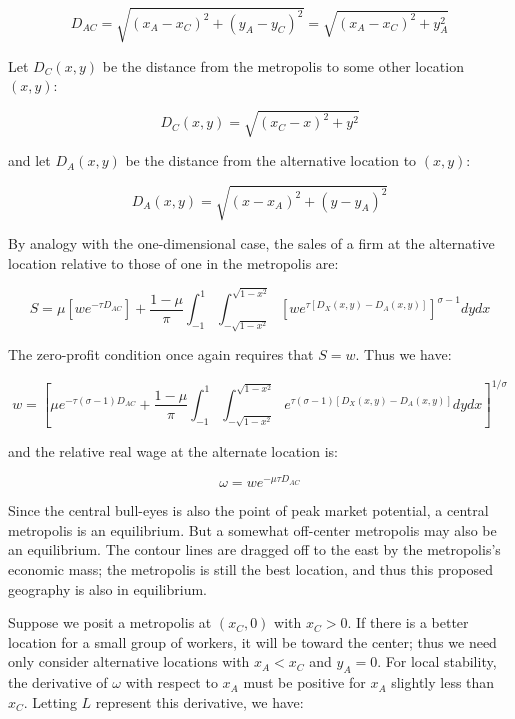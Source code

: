 \begin{equation}
    D_{AC} = \sqrt{(x_A - x_C)^2 + (y_A - y_C)^2} = \sqrt{(x_A - x_C)^2 + y_A^2}
\end{equation}

Let $D_C(x, y)$ be the distance from the metropolis to some other location $(x, y)$:

\begin{equation}
    D_C(x, y) = \sqrt{(x_C - x)^2 + y^2}
\end{equation}

and let $D_A(x, y)$ be the distance from the alternative location to $(x, y)$:

\begin{equation}
    D_A(x, y) = \sqrt{(x - x_A)^2 + (y - y_A)^2}
\end{equation}

By analogy with the one-dimensional case, the sales of a firm at the alternative location relative to those of one in the metropolis are:

\begin{equation}
    S = \mu[w e^{-\tau D_{AC}}] + \frac{1 - \mu}{\pi} \int_{-1}^1 \int_{-\sqrt{1 - x^2}}^{\sqrt{1 - x^2}} [w e^{\tau [D_X(x, y) - D_A(x, y)]}]^{\sigma - 1} dy dx
\end{equation}

The zero-profit condition once again requires that $S = w$. Thus we have:

\begin{equation}
    w = [\mu e^{-\tau(\sigma - 1) D_{AC}} + \frac{1 - \mu}{\pi} \int_{-1}^1 \int_{-\sqrt{1 - x^2}}^{\sqrt{1 - x^2}} e^{\tau(\sigma - 1) [D_X(x, y) - D_A(x, y)]} dy dx]^{1 / \sigma}
\end{equation}

and the relative real wage at the alternate location is:

\begin{equation}
    \omega = w e^{-\mu \tau D_{AC}}
\end{equation}

Since the central bull-eyes is also the point of peak market potential, a central metropolis is an equilibrium. But a somewhat off-center metropolis may also be an equilibrium. The contour lines are dragged off to the east by the metropolis's economic mass; the metropolis is still the best location, and thus this proposed geography is also in equilibrium.

Suppose we posit a metropolis at $(x_C, 0)$ with $x_C > 0$. If there is a better location for a small group of workers, it will be toward the center; thus we need only consider alternative locations with $x_A < x_C$ and $y_A = 0$. For local stability, the derivative of $\omega$ with respect to $x_A$ must be positive for $x_A$ slightly less than $x_C$. Letting $L$ represent this derivative, we have:

